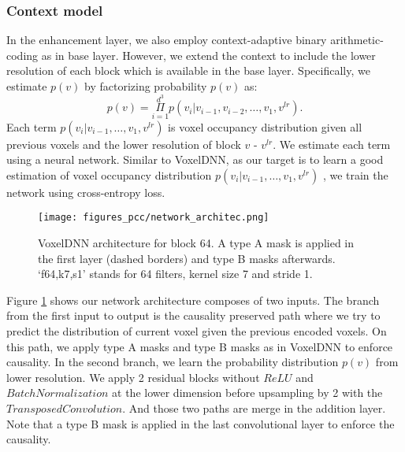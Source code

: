 \subsubsection{Context model} 
\label{subsub:context model}
\par In the enhancement layer, we also employ context-adaptive binary arithmetic-coding as in base layer. However, we extend the context to include the lower resolution of each block which is available in the base layer. Specifically, we estimate $p(v)$ by factorizing probability $p(v)$ as:
\begin{equation}
    p(v)= \underset{i=1 }{\overset{d^3}{\Pi}}p(v_i|v_{i-1},v_{i-2},\ldots,v_{1}, v^{lr}).
    \label{eq:pvlr}
\end{equation}
Each term $p(v_i|v_{i-1}, \ldots, v_1,v^{lr})$ is voxel occupancy distribution given all previous voxels and the lower resolution of block $v$ -  $v^{lr}$. We estimate each term using a neural network. Similar to VoxelDNN, as our target is to learn a good estimation of voxel occupancy distribution $p(v_i|v_{i-1}, \ldots, v_1,v^{lr})$ , we train the network using cross-entropy loss.
%
\begin{figure}[tb]
\captionsetup{singlelinecheck = false, format= hang, justification=raggedright, font=small, labelsep=space}
\centering
\texttt{[image: figures\_pcc/network\_architec.png]}
\caption{VoxelDNN architecture for block 64. A type A mask is applied in the first layer (dashed borders) and type B masks afterwards. `f64,k7,s1' stands for 64 filters, kernel size 7 and stride 1. }
\label{fig:Networkarchitecture2}
\end{figure}

\par Figure \ref{fig:Networkarchitecture2} shows our network architecture composes of two inputs. The branch from the first input to output is the causality preserved path where we try to predict the distribution of current voxel given the previous encoded voxels. On this path, we apply type A masks and type B masks as in VoxelDNN to enforce causality. In the second branch, we learn the probability distribution $p(v)$ from lower resolution. We apply 2 residual blocks without $ReLU$ and $BatchNormalization$ at the lower dimension before upsampling by 2 with the $TransposedConvolution$. And those two paths are merge in the addition layer. Note that a type B mask is applied in the last convolutional layer to enforce the causality. 
